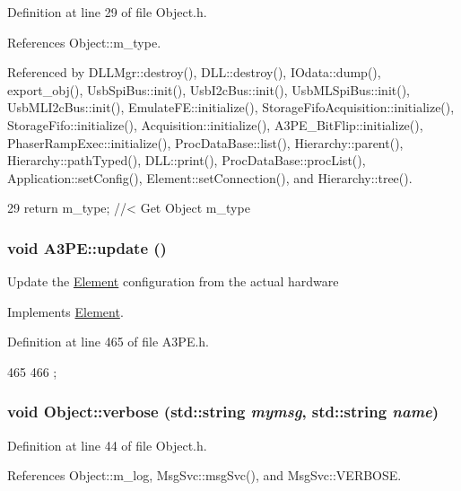 Definition at line 29 of file Object.h.

References Object::m\_\-type.

Referenced by DLLMgr::destroy(), DLL::destroy(), IOdata::dump(), export\_\-obj(), UsbSpiBus::init(), UsbI2cBus::init(), UsbMLSpiBus::init(), UsbMLI2cBus::init(), EmulateFE::initialize(), StorageFifoAcquisition::initialize(), StorageFifo::initialize(), Acquisition::initialize(), A3PE\_\-BitFlip::initialize(), PhaserRampExec::initialize(), ProcDataBase::list(), Hierarchy::parent(), Hierarchy::pathTyped(), DLL::print(), ProcDataBase::procList(), Application::setConfig(), Element::setConnection(), and Hierarchy::tree().


\begin{DoxyCode}
29 { return m_type;       } //< Get Object m_type
\end{DoxyCode}
\hypertarget{classA3PE_a9e9b5ba5bd0ee19470c80761269a00f6}{
\subsubsection[{update}]{\setlength{\rightskip}{0pt plus 5cm}void A3PE::update ()}}
\label{classA3PE_a9e9b5ba5bd0ee19470c80761269a00f6}
Update the \hyperlink{classElement}{Element} configuration from the actual hardware 

Implements \hyperlink{classElement_a4e6c83efae95616ebddd03c793a26661}{Element}.

Definition at line 465 of file A3PE.h.


\begin{DoxyCode}
465                  {
466   };
\end{DoxyCode}
\hypertarget{classObject_a2d4120195317e2a3c6532e8bb9f3da68}{
\subsubsection[{verbose}]{\setlength{\rightskip}{0pt plus 5cm}void Object::verbose (std::string {\em mymsg}, \/  std::string {\em name})}}
\label{classObject_a2d4120195317e2a3c6532e8bb9f3da68}


Definition at line 44 of file Object.h.

References Object::m\_\-log, MsgSvc::msgSvc(), and MsgSvc::VERBOSE.


